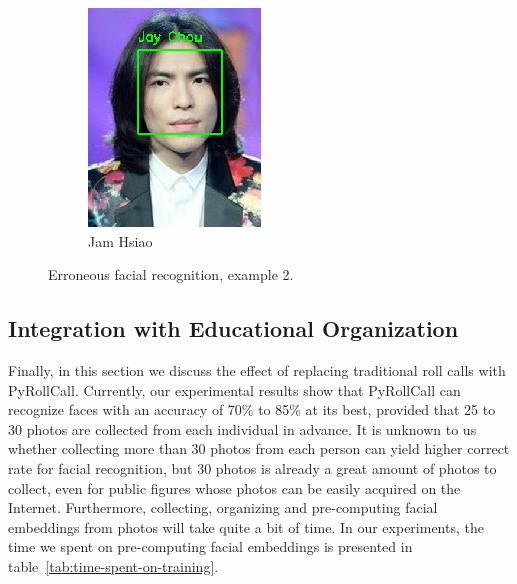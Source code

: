 \begin{figure}[!htb]
\begin{subfigure}[b]{0.3\linewidth}
    \includegraphics[width=\linewidth]{figures/false-recog-error2.png}
    \caption{Jam Hsiao}
  \end{subfigure}
  \caption{Erroneous facial recognition, example 2.}
  \label{fig:false-recog2}
\end{figure}
\vspace{0.2cm}



\subsection{Integration with Educational Organization}
Finally, in this section we discuss the effect of replacing traditional roll calls with PyRollCall.
Currently, our experimental results show that PyRollCall can recognize faces with an accuracy of 70\% to 85\%
at its best, provided that 25 to 30 photos are collected from each individual in advance.
It is unknown to us whether collecting more than 30 photos from each person can yield higher correct rate
for facial recognition, but 30 photos is already a great amount of photos to collect, even for
public figures whose photos can be easily acquired on the Internet. Furthermore, collecting, organizing and pre-computing
facial embeddings from photos will take quite a bit of time. In our experiments, the time we spent on pre-computing
facial embeddings is presented in table~\ref{tab:time-spent-on-training}.

